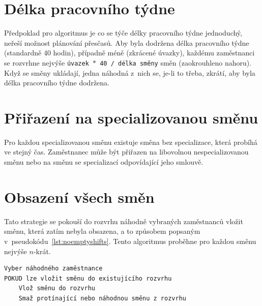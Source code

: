 \documentclass[twoside]{ctuthesis}
\begin{document}
\section{Délka pracovního týdne}
Předpoklad pro algoritmus je co se týče délky pracovního týdne jednoduchý, neřeší možnost plánování přesčasů. Aby byla dodržena délka pracovního týdne (standardně 40 hodin), případně méně (zkrácené úvazky), každému zaměstnanci se rozvrhne nejvýše \texttt{úvazek $\ast$ 40 / délka směny} směn (zaokrouhleno nahoru). Když se směny ukládají, jedna náhodná z~nich se, je-li to třeba, zkrátí, aby byla délka pracovního týdne dodržena.

\section{Přiřazení na specializovanou směnu}

Pro každou specializovanou směnu existuje směna bez specializace, která probíhá ve stejný čas. Zaměstnanec může být přiřazen na libovolnou nespecializovanou směnu nebo na směnu se specializací odpovídající jeho smlouvě.

\section{Obsazení všech směn}
Tato strategie se pokouší do rozvrhu náhodně vybraných zaměstnanců vložit směnu, která zatím nebyla obsazena, a to způsobem popsaným v~pseudokódu~\ref{lst:noemptyshifts}. Tento algoritmus proběhne pro každou směnu nejvýše $n$-krát.



\begin{lstlisting}[caption={Strategie pro vylepšování obsazení všech směn}, label={lst:noemptyshifts}]
Vyber náhodného zaměstnance
POKUD lze vložit směnu do existujícího rozvrhu
	Vlož směnu do rozvrhu
	Smaž protínající nebo náhodnou směnu z rozvrhu
\end{lstlisting}


\end{document}
